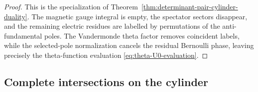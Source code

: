 \documentclass[11pt,a4paper]{article}
\makeatletter
\numberwithin{equation}{section}
\theoremstyle{plain}
\theoremstyle{definition}
\theoremstyle{remark}
\newcounter{mathrecordid}
\newcommand{\mathboxbegin}[1]{%
  \stepcounter{mathrecordid}%
  \immediate\write\mathrecords{\themathrecordid,#1}%
  \special{pdf:bann << /Type /Annot /Subtype /Link /Border [0 0 0]
    /MathBoxID \themathrecordid /F 2
    /A << /S /URI /URI (urn:mathbox:\themathrecordid) >> >>}}
\newcommand{\mathboxinlineplain}[1]{$#1$}
\newcommand{\mathboxinline}[1]{%
  $\mathboxbegin{inline}#1\special{pdf:eann}$}
\newcommand{\recordmath}{%
  \ifmeasuring@\expandafter\mathboxinlineplain
  \else\expandafter\mathboxinline\fi}
\makeatother
\begin{document}
\begin{proof}
This is the \recordmath{n=0} specialization of Theorem~\ref{thm:determinant-pair-cylinder-duality}.  The magnetic gauge integral is empty, the spectator sectors disappear, and the remaining electric residues are labelled by permutations of the \recordmath{N} anti-fundamental poles.  The Vandermonde theta factor removes coincident labels, while the selected-pole normalization cancels the residual Bernoulli phase, leaving precisely the theta-function evaluation \eqref{eq:theta-U0-evaluation}.
\end{proof}

\subsection{Complete intersections on the cylinder}
\label{sec:complete-intersections-cylinder}
\end{document}
